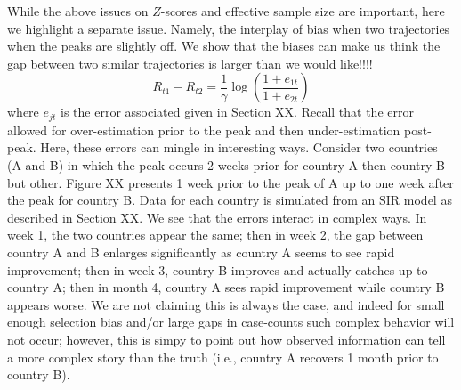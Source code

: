 \documentclass[aoas]{amsart}
\begin{document}
While the above issues on $Z$-scores and effective sample size are important, here we highlight a separate issue.  Namely, the interplay of bias when two trajectories when the peaks are slightly off.  We show that the biases can make us think the gap between two similar trajectories is larger than we would like!!!!
$$
R_{t1} - R_{t2} = \frac{1}{\gamma} \log \left( \frac{1 + e_{1t}}{1+e_{2t}} \right)
$$
where $e_{jt}$ is the error associated given in Section XX.  Recall that the error allowed for over-estimation prior to the peak and then under-estimation post-peak.  Here, these errors can mingle in interesting ways.  Consider two countries (A and B) in which the peak occurs 2 weeks prior for country A then country B but other.  Figure XX presents 1 week prior to the peak of A up to one week after the peak for country B.  Data for each country is simulated from an SIR model as described in Section XX.  We see that the errors interact in complex ways.  In week 1, the two countries appear the same; then in week 2, the gap between country A and B enlarges significantly as country A seems to see rapid improvement; then in week 3, country B improves and actually catches up to country A; then in month 4, country A sees rapid improvement while country B appears worse.  We are not claiming this is always the case, and indeed for small enough selection bias and/or large gaps in case-counts such complex behavior will not occur; however, this is simpy to point out how observed information can tell a more complex story than the truth (i.e., country A recovers 1 month prior to country B).
\end{document}
